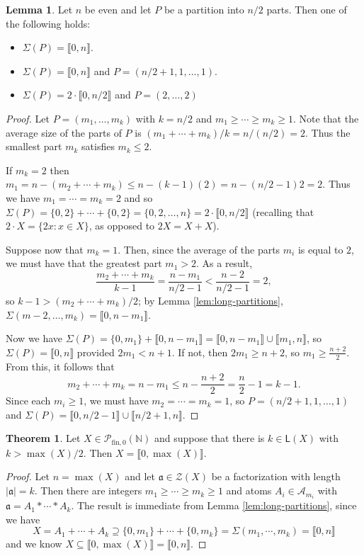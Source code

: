 \documentclass{report}
\newcommand{\A}{\mathscr{A}}
\renewcommand{\aa}{\mathfrak{a}}
\newcommand{\NN}{\mathbb{N}}
\renewcommand{\P}{\mathcal{P}}
\newcommand{\Z}{\mathcal{Z}}
\newcommand{\llb}{\llbracket}
\newcommand{\rrb}{\rrbracket}
\newcommand{\fin}{\textrm{fin}}
\renewcommand{\:}{\text{:}}
\newcommand{\PN}{{\P_{\fin,0}(\NN)}}
\theoremstyle{definition}
\newtheorem{lemma}[defn]{Lemma}
\newtheorem{thm}[defn]{Theorem}
\begin{document}
\begin{lemma} \label{lem:n/2-partitions}
Let $n$ be even and let $P$ be a partition into $n/2$ parts.
Then one of the following holds:
\begin{itemize}
	\item $\Sigma(P) = \llb 0, n \rrb$.
	\item $\Sigma(P) = \llb 0,n \rrb$ and $P = (n/2+1,1,\dots,1)$.
	\item $\Sigma(P) = 2\cdot \llb 0, n/2 \rrb$ and $P = (2,\dots, 2)$
\end{itemize}
\end{lemma}

\begin{proof}
Let $P = (m_1,\dots, m_k)$ with $k=n/2$ and $m_1\ge \cdots \ge m_k \ge 1$.
Note that the average size of the parts of $P$ is $(m_1+\cdots+m_k)/k = n/(n/2) = 2$.
Thus the smallest part $m_k$ satisfies $m_k \le 2$.

If $m_k = 2$ then $m_1 = n - (m_2+\cdots+m_k) \le n - (k-1)(2) = n - (n/2-1)2 = 2$.
Thus we have $m_1 = \cdots = m_k = 2$ and so $\Sigma(P) = \{0,2\}+\cdots+\{0,2\} = \{0,2,\dots,n\} = 2\cdot\llb0,n/2\rrb$ (recalling that $2\cdot X = \{2x: x\in X\}$, as opposed to $2X = X+X$).

Suppose now that $m_k=1$.
Then, since the average of the parts $m_i$ is equal to $2$, we must have that the greatest part $m_1 > 2$.
As a result, 
\[\frac{m_2+\cdots+m_k}{k-1} = \frac{n-m_1}{n/2-1} < \frac{n-2}{n/2-1} = 2, \]
so $k-1 > (m_2 + \cdots + m_k)/2$; by Lemma \ref{lem:long-partitions}, $\Sigma(m-2,\dots,m_k) = \llb 0, n-m_1 \rrb$.

Now we have $\Sigma(P) = \{0,m_1\} + \llb 0,n-m_1\rrb = \llb 0,n-m_1 \rrb \cup \llb m_1, n\rrb$, so $\Sigma(P) = \llb 0,n \rrb$ provided $2m_1 < n+1$.
If not, then $2m_1 \ge n+2$, so $m_1 \ge \frac{n+2}{2}$.
From this, it follows that 
\[m_2 +\cdots+m_k = n-m_1 \le n - \frac{n+2}{2} = \frac{n}{2}-1 = k-1.\]
Since each $m_i \ge 1$, we must have $m_2 = \cdots = m_k = 1$, so $P = (n/2+1, 1,\dots, 1)$ and $\Sigma(P) = \llb 0,n/2-1 \rrb \cup \llb n/2+1,n\rrb$.
\end{proof}

\begin{thm}
Let $X \in \PN$ and suppose that there is $k\in \mathsf{L}(X)$ with $k > \max(X)/2$.
Then $X = \llb 0, \max(X) \rrb$.
\end{thm}

\begin{proof}
Let $n = \max(X)$ and let $\aa\in\Z(X)$ be a factorization with length $|\aa| = k$.
Then there are integers $m_1\ge\cdots \ge m_k \ge 1$ and atoms $A_i\in \A_{m_i}$ with $\aa = A_1*\cdots*A_k$.
The result is immediate from Lemma \ref{lem:long-partitions}, since we have
\[ X = A_1 + \cdots + A_k \supseteq \{0,m_1\} + \cdots + \{0,m_k\} = \Sigma(m_1,\cdots,m_k) = \llb 0,n \rrb \]
and we know $X \subseteq \llb 0,\max(X) \rrb = \llb 0, n \rrb$.
\end{proof}
\end{document}
